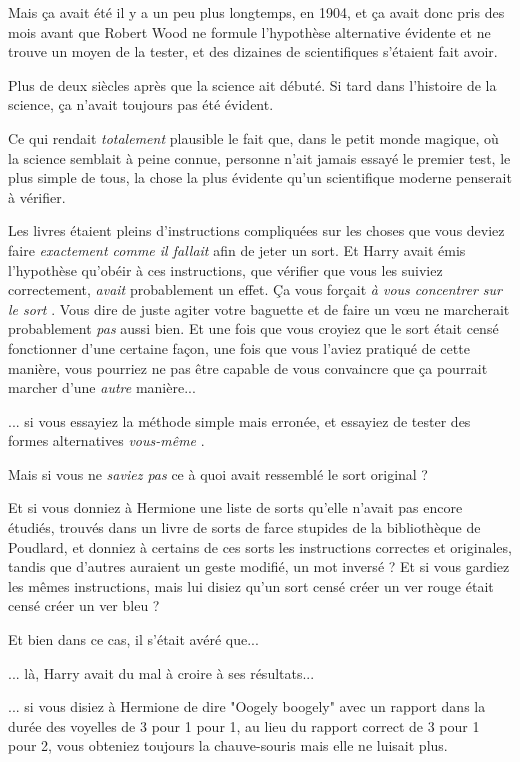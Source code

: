 Mais ça avait été il y a un peu plus longtemps, en 1904, et ça avait donc pris des mois avant que Robert Wood ne formule l'hypothèse alternative évidente et ne trouve un moyen de la tester, et des dizaines de scientifiques s'étaient fait avoir.

Plus de deux siècles après que la science ait débuté. Si tard dans l'histoire de la science, ça n'avait toujours pas été évident.

Ce qui rendait \emph{totalement}  plausible le fait que, dans le petit monde magique, où la science semblait à peine connue, personne n'ait jamais essayé le premier test, le plus simple de tous, la chose la plus évidente qu'un scientifique moderne penserait à vérifier.

Les livres étaient pleins d'instructions compliquées sur les choses que vous deviez faire \emph{exactement comme il fallait}  afin de jeter un sort. Et Harry avait émis l'hypothèse qu'obéir à ces instructions, que vérifier que vous les suiviez correctement, \emph{avait}  probablement un effet. Ça vous forçait\emph{ à vous concentrer sur le sort} . Vous dire de juste agiter votre baguette et de faire un vœu ne marcherait probablement \emph{pas}  aussi bien. Et une fois que vous croyiez que le sort était censé fonctionner d'une certaine façon, une fois que vous l'aviez pratiqué de cette manière, vous pourriez ne pas être capable de vous convaincre que ça pourrait marcher d'une \emph{autre}  manière...

... si vous essayiez la méthode simple mais erronée, et essayiez de tester des formes alternatives \emph{vous-même} .

Mais si vous ne \emph{saviez pas}  ce à quoi avait ressemblé le sort original ?

Et si vous donniez à Hermione une liste de sorts qu'elle n'avait pas encore étudiés, trouvés dans un livre de sorts de farce stupides de la bibliothèque de Poudlard, et donniez à certains de ces sorts les instructions correctes et originales, tandis que d'autres auraient un geste modifié, un mot inversé ? Et si vous gardiez les mêmes instructions, mais lui disiez qu'un sort censé créer un ver rouge était censé créer un ver bleu ?

Et bien dans ce cas, il s'était avéré que...

... là, Harry avait du mal à croire à ses résultats...

... si vous disiez à Hermione de dire "Oogely boogely" avec un rapport dans la durée des voyelles de 3 pour 1 pour 1, au lieu du rapport correct de 3 pour 1 pour 2, vous obteniez toujours la chauve-souris mais elle ne luisait plus.

